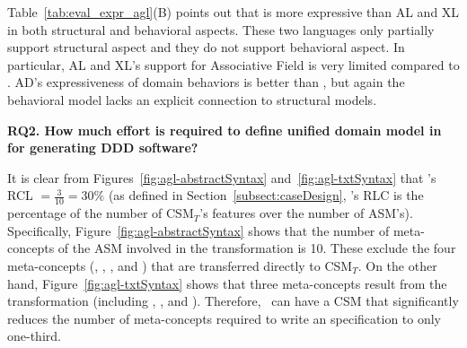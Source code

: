 Table~\ref{tab:eval_expr_agl}(B) points out that \agldcsl is more expressive than AL and XL in both structural and behavioral aspects. These two languages only partially support structural aspect and they do not support behavioral aspect. In particular, AL and XL's support for Associative Field is very limited compared to \agldcsl. AD's expressiveness of domain behaviors is better than \agl, but again the behavioral model lacks an explicit connection to structural models.


\noindent \textbf{RQ2. How much effort is required to define unified domain model in \agldcsl for generating DDD software?}


It is clear from Figures~\ref{fig:agl-abstractSyntax} and~\ref{fig:agl-txtSyntax} that \agl's RCL $ = \frac{3}{10}=30\%$ (as defined in Section~\ref{subsect:caseDesign}, \agl's RLC is the percentage of the number of CSM$_T$'s features over the number of ASM's). Specifically, Figure~\ref{fig:agl-abstractSyntax} shows that the number of meta-concepts of the ASM involved in the transformation is 10. These exclude the four meta-concepts (, , , and ) that are transferred directly to CSM$_T$. On the other hand, Figure~\ref{fig:agl-txtSyntax} shows that three meta-concepts result from the transformation (including , , and ). Therefore, \agl~can have a CSM that significantly reduces the number of meta-concepts required to write an \agl specification to only one-third. 

